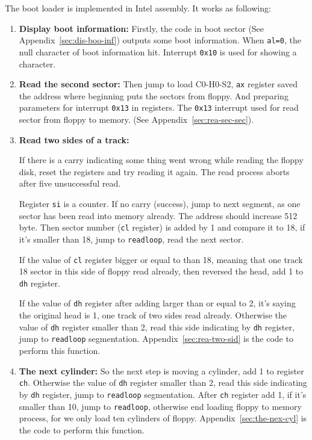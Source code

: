 \documentclass{swfcthesis}
\begin{document}
The boot loader is implemented in Intel assembly. It works as following:

\begin{enumerate}
\item \textbf{Display boot information:} Firstly, the code in boot sector (See
  Appendix~\ref{sec:dis-boo-inf}) outputs some boot information. When \texttt{al=0}, the
  null character of boot information hit. Interrupt \texttt{0x10} is used for showing a
  character.
\item \textbf{Read the second sector:} Then jump to load C0-H0-S2, \texttt{ax} register
  saved the address where beginning puts the sectors from floppy. And preparing parameters
  for interrupt \texttt{0x13} in registers. The \texttt{0x13} interrupt used for read
  sector from floppy to memory. (See Appendix~\ref{sec:rea-sec-sec}).
\item \textbf{Read two sides of a track:} 
  
  If there is a carry indicating some thing went wrong while reading the floppy disk,
  reset the registers and try reading it again. The read process aborts after five
  unsuccessful read.

  Register \texttt{si} is a counter. If no carry (success), jump to next segment, as one
  sector has been read into memory already. The address should increase 512 byte. Then
  sector number (\texttt{cl} register) is added by 1 and compare it to 18, if it's smaller
  than 18, jump to \texttt{readloop}, read the next sector.

  If the value of \texttt{cl} register bigger or equal to than 18, meaning that one track
  18 sector in this side of floppy read already, then reversed the head, add 1 to
  \texttt{dh} register.

  If the value of \texttt{dh} register after adding larger than or equal to 2, it's saying
  the original head is 1, one track of two sides read already. Otherwise the value of
  \texttt{dh} register smaller than 2, read this side indicating by \texttt{dh} register,
  jump to \texttt{readloop} segmentation. Appendix~\ref{sec:rea-two-sid} is the code to
  perform this function.
\item \textbf{The next cylinder:} So the next step is moving a cylinder, add 1 to register
  \texttt{ch}. Otherwise the value of \texttt{dh} register smaller than 2, read this side
  indicating by \texttt{dh} register, jump to \texttt{readloop} segmentation. After
  \texttt{ch} register add 1, if it's smaller than 10, jump to \texttt{readloop},
  otherwise end loading floppy to memory process, for we only load ten cylinders of
  floppy. Appendix~\ref{sec:the-nex-cyl} is the code to perform this function.
\end{enumerate}
\end{document}
